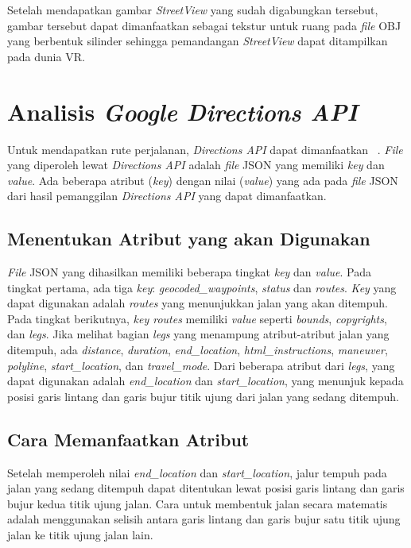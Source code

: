 Setelah mendapatkan gambar \textit{StreetView} yang sudah digabungkan tersebut, gambar tersebut dapat dimanfaatkan sebagai tekstur untuk ruang pada \textit{file} OBJ yang berbentuk silinder sehingga pemandangan \textit{StreetView} dapat ditampilkan pada dunia VR.

\section{Analisis \textit{Google Directions API}}

Untuk mendapatkan rute perjalanan, \textit{Directions API} dapat dimanfaatkan ~\cite{directions-api}. \textit{File} yang diperoleh lewat \textit{Directions API} adalah \textit{file} JSON yang memiliki \textit{key} dan \textit{value}. Ada beberapa atribut (\textit{key}) dengan nilai (\textit{value}) yang ada pada \textit{file} JSON dari hasil pemanggilan \textit{Directions API} yang dapat dimanfaatkan.

\subsection{Menentukan Atribut yang akan Digunakan}
\textit{File} JSON yang dihasilkan memiliki beberapa tingkat \textit{key} dan \textit{value}. Pada tingkat pertama, ada tiga \textit{key}: \textit{geocoded\_waypoints}, \textit{status} dan \textit{routes}. \textit{Key} yang dapat digunakan adalah \textit{routes} yang menunjukkan jalan yang akan ditempuh. Pada tingkat berikutnya, \textit{key routes} memiliki \textit{value} seperti \textit{bounds}, \textit{copyrights}, dan \textit{legs}. Jika melihat bagian \textit{legs} yang menampung atribut-atribut jalan yang ditempuh, ada {\it distance}, {\it duration}, {\it end\_location}, {\it html\_instructions}, {\it maneuver}, {\it polyline}, {\it start\_location}, dan \textit{travel\_mode}. Dari beberapa atribut dari \textit{legs}, yang dapat digunakan adalah \textit{end\_location} dan \textit{start\_location}, yang menunjuk kepada posisi garis lintang dan garis bujur titik ujung dari jalan yang sedang ditempuh. 

\subsection{Cara Memanfaatkan Atribut}
\label{subs:directions-attr-use}
Setelah memperoleh nilai \textit{end\_location} dan \textit{start\_location}, jalur tempuh pada jalan yang sedang ditempuh dapat ditentukan lewat posisi garis lintang dan garis bujur kedua titik ujung jalan. Cara untuk membentuk jalan secara matematis adalah menggunakan selisih antara garis lintang dan garis bujur satu titik ujung jalan ke titik ujung jalan lain. 

